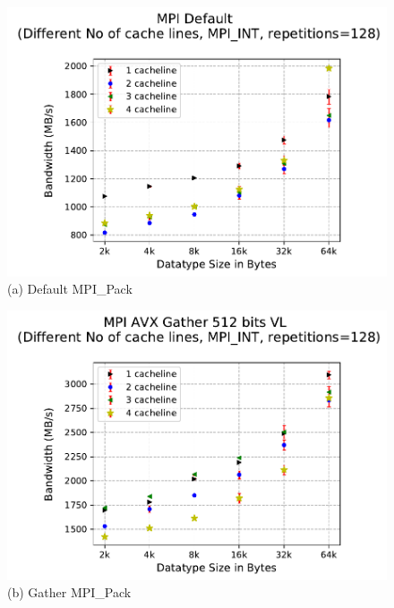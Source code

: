 \documentclass[conference]{IEEEtran}
\begin{document}
\begin{figure}[h]
\centering
\begin{minipage}{.45\textwidth}
  \centering
  \includegraphics[trim={0 0.7cm 0 1.5cm},clip,width=\linewidth]{to_self_avx_gather_20tests__default_cachelines.pdf}
  {(a) Default MPI\_Pack}
\end{minipage}\vspace{0.5cm}
\begin{minipage}{.45\textwidth}
  \centering
  \includegraphics[trim={0 0.7cm 0 1.5cm},clip,width=\linewidth]{to_self_avx_gather_20tests_cachelines.pdf}
  {(b) Gather MPI\_Pack}
\end{minipage}
\centering
\begin{minipage}{.45\textwidth}

\end{minipage}
\end{figure}
\end{document}
